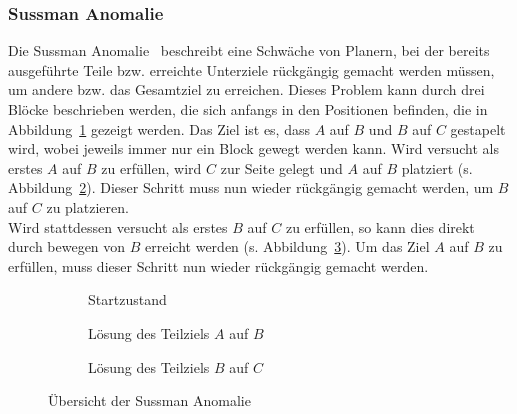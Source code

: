 \subsubsection{Sussman Anomalie}
Die Sussman Anomalie~\cite{sussman} beschreibt eine Schwäche von Planern, bei der bereits ausgeführte Teile bzw. erreichte Unterziele rückgängig gemacht werden müssen, um andere bzw. das Gesamtziel zu erreichen.
Dieses Problem kann durch drei Blöcke beschrieben werden, die sich anfangs in den Positionen befinden, die in Abbildung~\ref{fig:sussstart} gezeigt werden.
Das Ziel ist es, dass $A$ auf $B$ und $B$ auf $C$ gestapelt wird, wobei jeweils immer nur ein Block gewegt werden kann.
Wird versucht als erstes $A$ auf $B$ zu erfüllen, wird $C$ zur Seite gelegt und $A$ auf $B$ platziert (s. Abbildung~\ref{fig:sussmanab}).
Dieser Schritt muss nun wieder rückgängig gemacht werden, um $B$ auf $C$ zu platzieren.\\
Wird stattdessen versucht als erstes $B$ auf $C$ zu erfüllen, so kann dies direkt durch bewegen von $B$ erreicht werden (s. Abbildung~\ref{fig:sussmanbc}).
Um das Ziel $A$ auf $B$ zu erfüllen, muss dieser Schritt nun wieder rückgängig gemacht werden.
\begin{figure}
    \begin{subfigure}[t]{0.3\textwidth}
        \centering
        \caption{Startzustand}
        \label{fig:sussstart}
    \end{subfigure}
    \hfill
    \begin{subfigure}[t]{0.3\textwidth}
        \centering
        \caption{Lösung des Teilziels $A$ auf $B$}
        \label{fig:sussmanab}
    \end{subfigure}
    \hfill
    \begin{subfigure}[t]{0.3\textwidth}
        \centering
        \caption{Lösung des Teilziels $B$ auf $C$}
        \label{fig:sussmanbc}
    \end{subfigure}
    \caption{Übersicht der Sussman Anomalie}
    \label{fig:sussman}
\end{figure}
